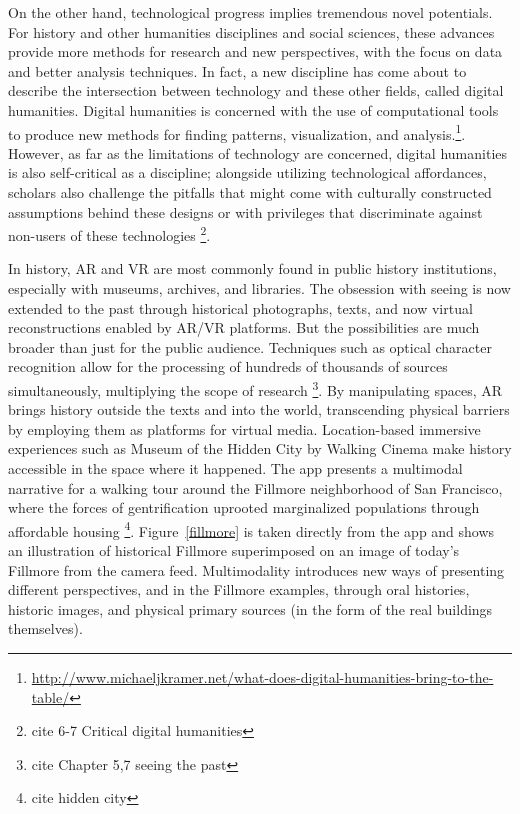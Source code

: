 On the other hand, technological progress implies tremendous novel potentials. For history and other humanities disciplines and social sciences, these advances provide more methods for research and new perspectives, with the focus on data and better analysis techniques. In fact, a new discipline has come about to describe the intersection between technology and these other fields, called digital humanities. Digital humanities is concerned with the use of computational tools to produce new methods for finding patterns, visualization, and analysis.\footnote{\url{http://www.michaeljkramer.net/what-does-digital-humanities-bring-to-the-table/}}. However, as far as the limitations of technology are concerned, digital humanities is also self-critical as a discipline; alongside utilizing technological affordances, scholars also challenge the pitfalls that might come with culturally constructed assumptions behind these designs or with privileges that discriminate against non-users of these technologies \footnote{cite 6-7 Critical digital humanities}.

In history, AR and VR are most commonly found in public history institutions, especially with museums, archives, and libraries. The obsession with seeing is now extended to the past through historical photographs, texts, and now virtual reconstructions enabled by AR/VR platforms. But the possibilities are much broader than just for the public audience. Techniques such as optical character recognition allow for the processing of hundreds of thousands of sources simultaneously, multiplying the scope of research \footnote{cite Chapter 5,7 seeing the past}. By manipulating spaces, AR brings history outside the texts and into the world, transcending physical barriers by employing them as platforms for virtual media. Location-based immersive experiences such as Museum of the Hidden City by Walking Cinema make history accessible in the space where it happened. The app presents a multimodal narrative for a walking tour around the Fillmore neighborhood of San Francisco, where the forces of gentrification uprooted marginalized populations through affordable housing \footnote{cite hidden city}. Figure~\ref{fillmore} is taken directly from the app and shows an illustration of historical Fillmore superimposed on an image of today's Fillmore from the camera feed. Multimodality introduces new ways of presenting different perspectives, and in the Fillmore examples, through oral histories, historic images, and physical primary sources (in the form of the real buildings themselves).

